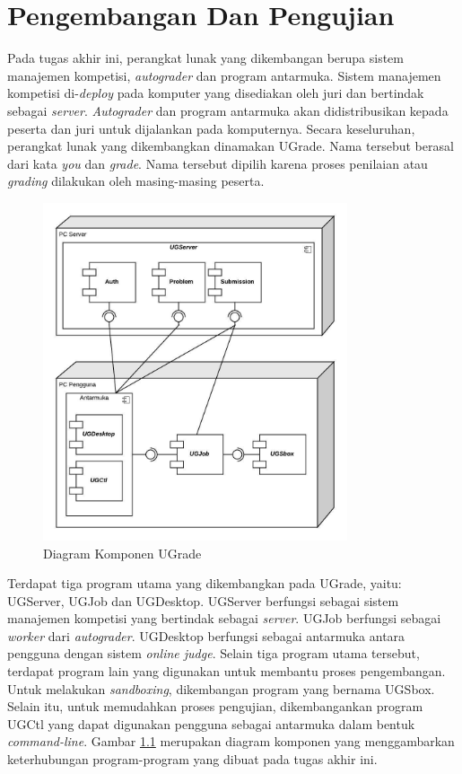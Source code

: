 \chapter{Pengembangan Dan Pengujian}

\par Pada tugas akhir ini, perangkat lunak yang dikembangan berupa sistem manajemen kompetisi, \textit{autograder} dan program antarmuka.  Sistem manajemen kompetisi di-\textit{deploy} pada komputer yang disediakan oleh juri dan bertindak sebagai \textit{server}. \textit{Autograder} dan program antarmuka akan didistribusikan kepada peserta dan juri untuk dijalankan pada komputernya. Secara keseluruhan, perangkat lunak yang dikembangkan dinamakan UGrade. Nama tersebut berasal dari kata \textit{you} dan \textit{grade}. Nama tersebut dipilih karena proses penilaian atau \textit{grading} dilakukan oleh masing-masing peserta.

\begin{figure}[ht!]
    \centering
    \includegraphics[width=0.8\textwidth]{images/oj-components-impl}
    \caption{Diagram Komponen UGrade}
    \label{fig:oj-components-impl}
\end{figure}

\par Terdapat tiga program utama yang dikembangkan pada UGrade, yaitu: UGServer, UGJob dan UGDesktop. UGServer berfungsi sebagai sistem manajemen kompetisi yang bertindak sebagai \textit{server}. UGJob berfungsi sebagai \textit{worker} dari \textit{autograder}. UGDesktop berfungsi sebagai antarmuka antara pengguna dengan sistem \textit{online judge}. Selain tiga program utama tersebut, terdapat program lain yang digunakan untuk membantu proses pengembangan. Untuk melakukan \textit{sandboxing}, dikembangan program yang bernama UGSbox. Selain itu, untuk memudahkan proses pengujian, dikembangankan program UGCtl yang dapat digunakan pengguna sebagai antarmuka dalam bentuk \textit{command-line}. Gambar \ref{fig:oj-components-impl} merupakan diagram komponen yang menggambarkan keterhubungan program-program yang dibuat pada tugas akhir ini.

